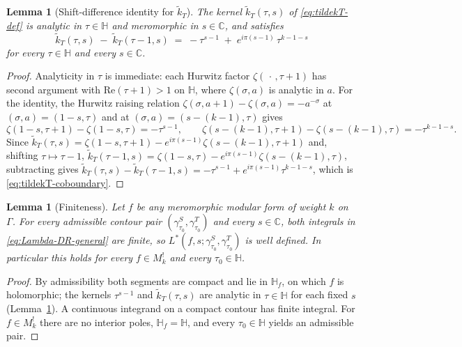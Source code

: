 \documentclass[11pt]{article}
\newtheorem{lemma}[theorem]{Lemma}
\numberwithin{equation}{section}  %
\newcommand{\HH}{\mathbb{H}}
\newcommand{\CC}{\mathbb{C}}
\begin{document}
\begin{lemma}[Shift-difference identity for $\widetilde{k}_T$]\label{lem:tildekT-coboundary}
The kernel $\widetilde{k}_T(\tau, s)$ of \eqref{eq:tildekT-def} is
analytic in $\tau \in \HH$ and meromorphic in $s \in \CC$, and
satisfies
\begin{equation}\label{eq:tildekT-coboundary}
  \widetilde{k}_T(\tau, s) \;-\; \widetilde{k}_T(\tau - 1, s)
  \;=\; -\tau^{s-1} \;+\; e^{i\pi(s-1)}\,\tau^{k - 1 - s}
\end{equation}
for every $\tau \in \HH$ and every $s \in \CC$.
\end{lemma}
\begin{proof}
Analyticity in $\tau$ is immediate: each Hurwitz factor
$\zeta(\,\cdot\,, \tau + 1)$ has second argument with
$\mathrm{Re}(\tau + 1) > 1$ on $\HH$, where $\zeta(\sigma, a)$ is
analytic in $a$.  For the identity, the Hurwitz raising relation
$\zeta(\sigma, a + 1) - \zeta(\sigma, a) = -a^{-\sigma}$
\cite[\S25.11.3]{DLMF} at $(\sigma, a) = (1 - s, \tau)$ and at
$(\sigma, a) = (s - (k - 1), \tau)$ gives
\begin{equation}
  \zeta(1 - s, \tau + 1) - \zeta(1 - s, \tau) = -\tau^{s-1},
  \qquad
  \zeta(s - (k-1), \tau + 1) - \zeta(s - (k-1), \tau) = -\tau^{k - 1 - s}.
\end{equation}
Since
$\widetilde{k}_T(\tau, s) = \zeta(1-s, \tau+1) - e^{i\pi(s-1)}\zeta(s-(k-1), \tau+1)$
and, shifting $\tau \mapsto \tau - 1$,
$\widetilde{k}_T(\tau - 1, s) = \zeta(1-s, \tau) - e^{i\pi(s-1)}\zeta(s-(k-1), \tau)$,
subtracting gives
$\widetilde{k}_T(\tau, s) - \widetilde{k}_T(\tau - 1, s) = -\tau^{s-1}
+ e^{i\pi(s-1)}\tau^{k-1-s}$, which is \eqref{eq:tildekT-coboundary}.
\end{proof}

\begin{lemma}[Finiteness]\label{lem:Lstar-finite}
Let $f$ be any meromorphic modular form of weight $k$ on $\Gamma$.
For every admissible contour pair
$(\gamma^S_{\tau_0}, \gamma^T_{\tau_0})$ and every $s \in \CC$, both
integrals in \eqref{eq:Lambda-DR-general} are finite, so
$L^*(f, s; \gamma^S_{\tau_0}, \gamma^T_{\tau_0})$ is well defined.  In
particular this holds for every $f \in M^!_k$ and every
$\tau_0 \in \HH$.
\end{lemma}
\begin{proof}
By admissibility both segments are compact and lie in $\HH_f$, on
which $f$ is holomorphic; the kernels $\tau^{s-1}$ and
$\widetilde{k}_T(\tau, s)$ are analytic in $\tau \in \HH$ for each
fixed $s$ (Lemma~\ref{lem:tildekT-coboundary}).  A continuous
integrand on a compact contour has finite integral.  For
$f \in M^!_k$ there are no interior poles, $\HH_f = \HH$, and every
$\tau_0 \in \HH$ yields an admissible pair.
\end{proof}
\end{document}
